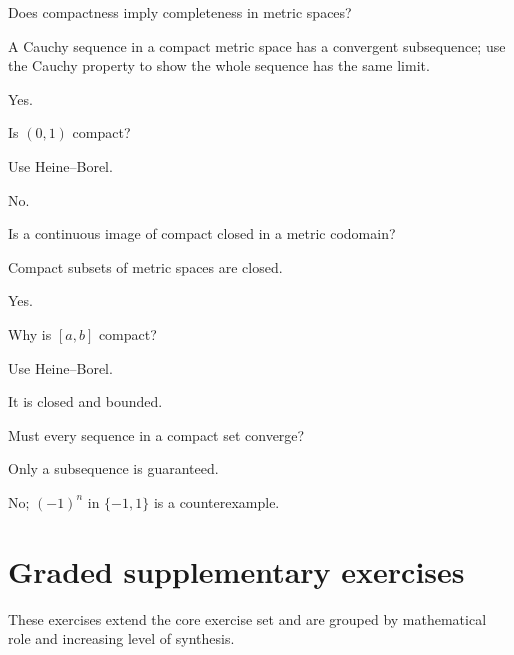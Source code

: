 \begin{exercise}\label{exr:ii06-04}
Does compactness imply completeness in metric spaces?
\end{exercise}
\begin{hint}
A Cauchy sequence in a compact metric space has a convergent subsequence; use the Cauchy property to show the whole sequence has the same limit.
\end{hint}
\begin{solution}
Yes.
\end{solution}

\begin{exercise}\label{exr:ii06-05}
Is $(0,1)$ compact?
\end{exercise}
\begin{hint}
Use Heine--Borel.
\end{hint}
\begin{solution}
No.
\end{solution}

\begin{exercise}\label{exr:ii06-06}
Is a continuous image of compact closed in a metric codomain?
\end{exercise}
\begin{hint}
Compact subsets of metric spaces are closed.
\end{hint}
\begin{solution}
Yes.
\end{solution}

\begin{exercise}\label{exr:ii06-07}
Why is $[a,b]$ compact?
\end{exercise}
\begin{hint}
Use Heine--Borel.
\end{hint}
\begin{solution}
It is closed and bounded.
\end{solution}

\begin{exercise}\label{exr:ii06-08}
Must every sequence in a compact set converge?
\end{exercise}
\begin{hint}
Only a subsequence is guaranteed.
\end{hint}
\begin{solution}
No; $(-1)^n$ in $\{-1,1\}$ is a counterexample.
\end{solution}


\section{Graded supplementary exercises}
These exercises extend the core exercise set and are grouped by mathematical role and increasing level of synthesis.

